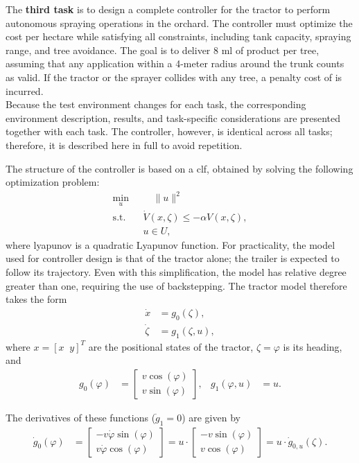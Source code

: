 \documentclass{article}
\begin{document}
    The \textbf{third task} is to design a complete controller for the tractor to perform autonomous spraying operations in the orchard. The controller must optimize the cost per hectare while satisfying all constraints, including tank capacity, spraying range, and tree avoidance. The goal is to deliver 8 ml of product per tree, assuming that any application within a 4-meter radius around the trunk counts as valid. If the tractor or the sprayer collides with any tree, a penalty cost of  is incurred.\\

   Because the test environment changes for each task, the corresponding environment description, results, and task-specific considerations are presented together with each task. The controller, however, is identical across all tasks; therefore, it is described here in full to avoid repetition.

    The structure of the controller is based on a \gls{clf}, obtained by solving the following optimization problem:
    \begin{align*}
        \underset{u}{\text{min}} &\quad \|u\|^2 \\
        \text{s.t.} \quad & \dot{V}(x,\zeta) \leq -\alpha V(x,\zeta), \\
        & u \in U,
    \end{align*}
    where \gls{lyapunov} is a quadratic Lyapunov function. For practicality, the model used for controller design is that of the tractor alone; the trailer is expected to follow its trajectory. Even with this simplification, the model has relative degree greater than one, requiring the use of backstepping. The tractor model therefore takes the form
    \begin{align*}
        \dot{x} &= g_0(\zeta), \\
        \dot{\zeta} &= g_1(\zeta,u),
    \end{align*}
    where $x = [x\;\; y]^T$ are the positional states of the tractor, $\zeta = \varphi$ is its heading, and
    \begin{align*}
        g_0(\varphi) &=
        \begin{bmatrix}
            v \cos(\varphi) \\
            v \sin(\varphi)
        \end{bmatrix}, 
        &
        g_1(\varphi,u) &= u.
    \end{align*}

    The derivatives of these functions ($\dot{g}_1 = 0$) are given by
    \begin{align*}
        \dot{g}_0(\varphi) &=
        \begin{bmatrix}
            -v \dot{\varphi} \sin(\varphi) \\
            v \dot{\varphi} \cos(\varphi)
        \end{bmatrix}
        =
        u \cdot
        \begin{bmatrix}
            -v \sin(\varphi) \\
            v \cos(\varphi)
        \end{bmatrix}
        = u \cdot \dot{g}_{0,u}(\zeta).
    \end{align*}
\end{document}
